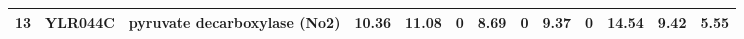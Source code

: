 \begin{table}[H]
\begin{center}
{\begin{tabular}{|c|c|l|c|c|c|c|c|c|c|c|c|c|}
13                                & \textbf{YLR044C} & pyruvate decarboxylase (No2)                                                              & 10.36              & 11.08              & 0                 & 8.69                       & 0             & 9.37            & 0                      & 14.54           & 9.42              & 5.55         \\ \hline




\end{tabular}}
\label{table:cumulative_gur10_stds}
\end{center}
\end{table}
